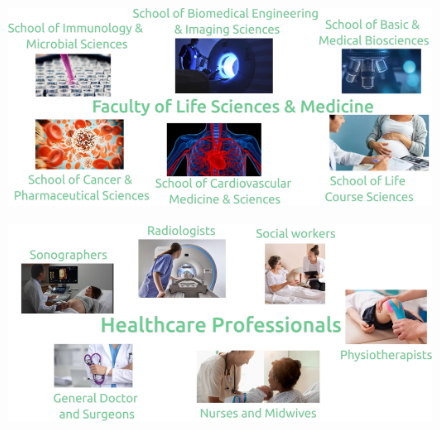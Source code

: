 
{
\begin{frame}{}

  \begin{figure}
  \centering
  \includegraphics[width=1.0\textwidth]{./../figures/schools-at-life-science-and-medicine/versions/drawing-v00}
  \end{figure}

\end{frame}
}



{
\begin{frame}{}

  \begin{figure}
  \centering
  \includegraphics[width=1.0\textwidth]{./../figures/healthcare-professionals/versions/drawing-v03}
  \end{figure}

\end{frame}
}


%
%


